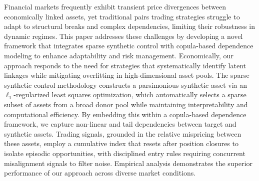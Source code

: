 Financial markets frequently exhibit transient price divergences between economically linked assets, yet traditional pairs trading strategies struggle to adapt to structural breaks and complex dependencies, limiting their robustness in dynamic regimes.
%
This paper addresses these challenges by developing a novel framework that integrates sparse synthetic control with copula-based dependence modeling to enhance adaptability and risk management.
%
Economically, our approach responds to the need for strategies that systematically identify latent linkages while mitigating overfitting in high-dimensional asset pools.
%
The sparse synthetic control methodology constructs a parsimonious synthetic asset via an $\ell_1$-regularized least squares optimization, which automatically selects a sparse subset of assets from a broad donor pool while maintaining interpretability and computational efficiency.
%
By embedding this within a copula-based dependence framework, we capture non-linear and tail dependencies between target and synthetic assets.
%
Trading signals, grounded in the relative mispricing between these assets, employ a cumulative index that resets after position closures to isolate episodic opportunities, with disciplined entry rules requiring concurrent misalignment signals to filter noise.
%
Empirical analysis demonstrates the superior performance of our approach across diverse market conditions.